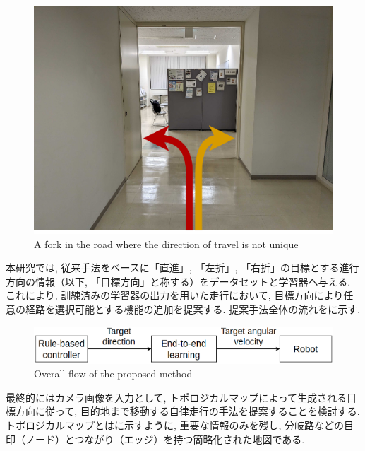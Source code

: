 \begin{figure}[hbtp]
     \centering
    \includegraphics[keepaspectratio, scale=0.5]
         {images/road.png}
    \caption{A fork in the road where the direction of travel is not unique}
    \label{Fig:road}
\end{figure}

\newpage

本研究では, 従来手法をベースに「直進」, 「左折」, 「右折」の目標とする進行方向の情報（以下, 「目標方向」と称する）をデータセットと学習器へ与える. これにより, 訓練済みの学習器の出力を用いた走行において, 目標方向により任意の経路を選択可能とする機能の追加を提案する. 提案手法全体の流れをに示す. 

\begin{figure}[hbtp]
     \centering
    \includegraphics[keepaspectratio, scale=0.38]
         {images/suggest_work.png}
    \caption{Overall flow of the proposed method}
    \label{Fig:suggest_work}
\end{figure}

最終的にはカメラ画像を入力として, トポロジカルマップによって生成される目標方向に従って, 目的地まで移動する自律走行の手法を提案することを検討する. トポロジカルマップとはに示すように, 重要な情報のみを残し, 分岐路などの目印（ノード）とつながり（エッジ）を持つ簡略化された地図である.

\vspace{0.5cm}


